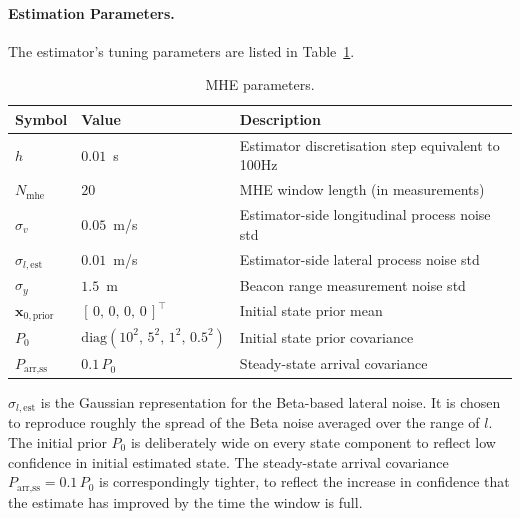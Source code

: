 \documentclass{article}
\begin{document}
\paragraph{Estimation Parameters.}
The estimator's tuning parameters are listed in Table~\ref{tab:est_params}.

\begin{table}[H]
    \centering
    \begin{tabular}{l|l|l}
        Symbol & Value & Description \\ \hline
        $h$                             & $0.01$~s                                          & Estimator discretisation step equivalent to 100Hz \\
        $N_{\text{mhe}}$                & $20$                                              & MHE window length (in measurements) \\
        $\sigma_{v}$                    & $0.05$~m/s                                        & Estimator-side longitudinal process noise std \\
        $\sigma_{l,\text{est}}$         & $0.01$~m/s                                        & Estimator-side lateral process noise std \\
        $\sigma_{y}$                    & $1.5$~m                                           & Beacon range measurement noise std \\
        $\mathbf{x}_{0,\text{prior}}$   & $[\,0,\,0,\,0,\,0\,]^{\top}$                      & Initial state prior mean \\
        $P_{0}$                         & $\mathrm{diag}(10^{2},\,5^{2},\,1^{2},\,0.5^{2})$ & Initial state prior covariance \\
        $P_{\text{arr,ss}}$             & $0.1\,P_{0}$                                      & Steady-state arrival covariance \\
    \end{tabular}
    \caption{MHE parameters.}
    \label{tab:est_params}
\end{table}

$\sigma_{l,\text{est}}$ is the Gaussian representation for the Beta-based lateral noise. It is chosen to reproduce roughly the spread of the Beta noise averaged over the range of $l$. The initial prior $P_{0}$ is deliberately wide on every state component to reflect low confidence in initial estimated state. The steady-state arrival covariance $P_{\text{arr,ss}} = 0.1\,P_{0}$ is correspondingly tighter, to reflect the increase in confidence that the estimate has improved by the time the window is full.
\end{document}
